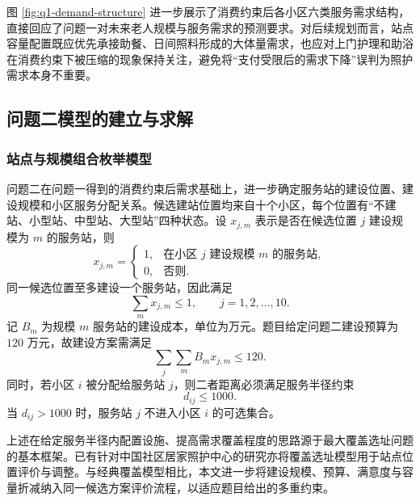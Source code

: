 图 \ref{fig:q1-demand-structure} 进一步展示了消费约束后各小区六类服务需求结构，直接回应了问题一对未来老人规模与服务需求的预测要求。对后续规划而言，站点容量配置既应优先承接助餐、日间照料形成的大体量需求，也应对上门护理和助浴在消费约束下被压缩的现象保持关注，避免将“支付受限后的需求下降”误判为照护需求本身不重要。

\subsection{问题二模型的建立与求解}

\subsubsection{站点与规模组合枚举模型}

问题二在问题一得到的消费约束后需求基础上，进一步确定服务站的建设位置、建设规模和小区服务分配关系。候选建站位置均来自十个小区，每个位置有“不建站、小型站、中型站、大型站”四种状态。设 $x_{j,m}$ 表示是否在候选位置 $j$ 建设规模为 $m$ 的服务站，则
\begin{equation}
  x_{j,m}=
  \begin{cases}
    1, & \text{在小区 }j\text{ 建设规模 }m\text{ 的服务站},\\
    0, & \text{否则}.
  \end{cases}
  \label{eq:q2-station-variable}
\end{equation}
同一候选位置至多建设一个服务站，因此满足
\begin{equation}
  \sum_m x_{j,m}\le 1,
  \qquad j=1,2,\ldots,10.
  \label{eq:q2-one-scale}
\end{equation}
记 $B_m$ 为规模 $m$ 服务站的建设成本，单位为万元。题目给定问题二建设预算为 $120$ 万元，故建设方案需满足
\begin{equation}
  \sum_j\sum_m B_mx_{j,m}\le120.
  \label{eq:q2-budget}
\end{equation}
同时，若小区 $i$ 被分配给服务站 $j$，则二者距离必须满足服务半径约束
\begin{equation}
  d_{ij}\le1000.
  \label{eq:q2-radius}
\end{equation}
当 $d_{ij}>1000$ 时，服务站 $j$ 不进入小区 $i$ 的可选集合。

上述在给定服务半径内配置设施、提高需求覆盖程度的思路源于最大覆盖选址问题的基本框架\cite{church1974}。已有针对中国社区居家照护中心的研究亦将覆盖选址模型用于站点位置评价与调整\cite{linwu2023}。与经典覆盖模型相比，本文进一步将建设规模、预算、满意度与容量折减纳入同一候选方案评价流程，以适应题目给出的多重约束。

